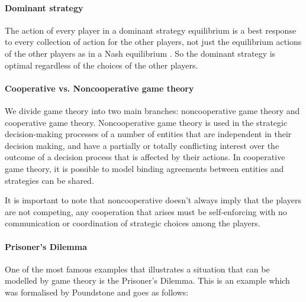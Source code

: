 \iffalse
\paragraph{Computational challenge} \fix{\@JW, wat is precies je bedoeling met deze alinea?}
The hardest challenge is not finding a Nash equilibrium \fb{why?}, but formulating an efficient algorithm. This notorious problem is described by Papdimitriou as 'the most fundamental computational problem whose complexity is wide open'\cite{daskalakis2009complexity}. \fb{PPAP compleet probleem} Although in many strategic interactions (games) the answer is negative \fb{what is the question?}, in some games Nash Equilibrium can be compute directly or approximated with the use of an heuristic method\cite{MicrogridModellingPetrosAristidou,AumannGameTheoryAccomplish} 
\fi

\paragraph{Dominant strategy} 
The action of every player in a dominant strategy equilibrium is a best response to every collection of action for the other players, not just the equilibrium actions of the other players as in a Nash equilibrium \cite{CourseInGameTheory}. So the dominant strategy is optimal regardless of the choices of the other players.

\paragraph{Cooperative vs. Noncooperative game theory} 
We divide game theory into two main branches: noncooperative game theory and cooperative game theory. Noncooperative game theory is used in the strategic decision-making processes of a number of entities that are independent in their decision making, and have a partially or totally conflicting interest over the outcome of a decision process that is affected by their actions\cite{keypaper}. In cooperative game theory, it is possible to model binding agreements between entities and strategies can be shared. 

It is important to note that noncooperative doesn't always imply that the players are not competing, any cooperation that arises must be self-enforcing with no communication or coordination of strategic choices among the players.\cite{keypaper}

\paragraph{Prisoner's Dilemma}
One of the most famous examples that illustrates a situation that can be modelled by game theory is the Prisoner's Dilemma. This is an example which was formalised by Poundstone \cite{poundstone} and goes as follows: 


